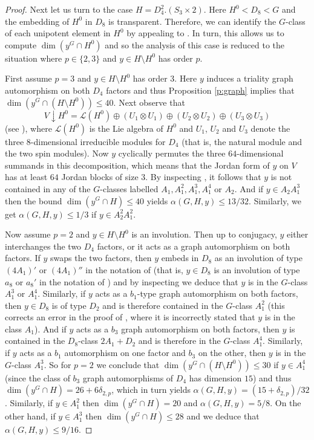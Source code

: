 \documentclass[twoside,a4paper,reqno,11pt]{amsart}
\renewcommand{\a}{\alpha}
\newcommand{\<}{\langle}
\renewcommand{\>}{\rangle}
\newcommand{\leqs}{\leqslant}
\renewcommand{\:}{\colon}
\theoremstyle{plain}
\theoremstyle{definition}
\begin{document}
\begin{proof}
Next let us turn to the case $H = D_4^2.(S_3 \times 2)$. Here $H^0 < D_8 < G$ and the embedding of $H^0$ in $D_8$ is transparent. Therefore, we can identify the $G$-class of each unipotent element in $H^0$ by appealing to \cite[Section 4.13]{Law2}. In turn, this allows us to compute $\dim (y^G \cap H^0)$ and so the analysis of this case is reduced to the situation where $p \in \{2,3\}$ and $y \in H \setminus H^0$ has order $p$. 

First assume $p=3$ and $y \in H \setminus H^0$ has order $3$. Here $y$ induces a triality graph automorphism on both $D_4$ factors and thus Proposition \ref{p:graph} implies that $\dim(y^G \cap (H \setminus H^0)) \leqs 40$. Next observe that
\[
V \downarrow H^0 = \mathcal{L}(H^0) \oplus (U_1 \otimes U_1) \oplus (U_2 \otimes U_2) \oplus (U_3 \otimes U_3)
\]
(see \cite[Table 5]{Thomas}), where $\mathcal{L}(H^0)$ is the Lie algebra of $H^0$ and $U_1$, $U_2$ and $U_3$ denote the three $8$-dimensional irreducible modules for $D_4$ (that is, the natural module and the two spin modules). Now $y$ cyclically permutes the three $64$-dimensional summands in this decomposition, which means that the Jordan form of $y$ on $V$ has at least $64$ Jordan blocks of size $3$. By inspecting \cite[Table 9]{Law1}, it follows that $y$ is not contained in any of the $G$-classes labelled $A_1, A_1^2, A_1^3, A_1^4$ or $A_2$. And if $y \in A_2A_1^3$ then the bound $\dim(y^G \cap H) \leqs 40$ yields $\a(G,H,y) \leqs 13/32$. Similarly, we get $\a(G,H,y) \leqs 1/3$ if $y \in A_2^2A_1^2$. 

Now assume $p=2$ and $y \in H \setminus H^0$ is an involution. Then up to conjugacy, $y$ either interchanges the two $D_4$ factors, or it acts as a graph automorphism on both factors. If $y$ swaps the two factors, then $y$ embeds in $D_8$ as an involution of type $(4A_1)'$ or $(4A_1)''$ in the notation of \cite[Table 8]{Law2} (that is, $y \in D_8$ is an involution of type $a_8$ or $a_8'$ in the notation of \cite{AS}) and by inspecting \cite[Section 4.13]{Law2} we deduce that $y$ is in the $G$-class $A_1^3$ or $A_1^4$. Similarly, if $y$ acts as a $b_1$-type graph automorphism on both factors, then $y \in D_8$ is of type $D_2$ and is therefore contained in the $G$-class $A_1^2$ (this corrects an error in the proof of \cite[Proposition 5.11]{BGS}, where it is incorrectly stated that $y$ is in the class $A_1$). And if $y$ acts as a $b_3$ graph automorphism on both factors, then $y$ is contained in the $D_8$-class $2A_1+D_2$ and is therefore in the $G$-class $A_1^4$. Similarly, if $y$ acts as a $b_1$ automorphism on one factor and $b_3$ on  the other, then $y$ is in the $G$-class $A_1^3$. So for $p=2$ we conclude that $\dim(y^G \cap (H \setminus H^0)) \leqs 30$ if $y \in A_1^4$ (since the class of $b_3$ graph automorphisms of $D_4$ has dimension $15$) and thus $\dim (y^G \cap H) = 26+6\delta_{2,p}$, which in turn yields $\a(G,H,y) = (15+\delta_{2,p})/32$. Similarly, if $y \in A_1^2$ then $\dim(y^G \cap H) = 20$ and $\a(G,H,y) = 5/8$. On the other hand, if $y \in A_1^3$ then $\dim(y^G \cap H) \leqs 28$ and we deduce that $\a(G,H,y) \leqs 9/16$.


\end{proof}
\end{document}
